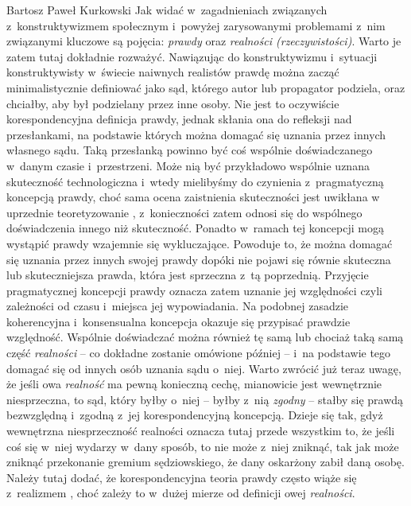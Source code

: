 \begin{artplenv}{Bartosz Paweł Kurkowski}
Jak widać w~zagadnieniach związanych z~konstruktywizmem społecznym i~powyżej zarysowanymi problemami z~nim związanymi
kluczowe są pojęcia: \textit{prawdy }oraz\textit{ realności (rzeczywistości)}. Warto je zatem tutaj dokładnie rozważyć.
Nawiązując do konstruktywizmu i~sytuacji konstruktywisty w~świecie naiwnych realistów prawdę można zacząć
minimalistycznie definiować jako sąd, którego autor lub propagator podziela, oraz chciałby, aby był podzielany przez
inne osoby. Nie jest to oczywiście korespondencyjna definicja prawdy, jednak skłania ona do refleksji nad przesłankami,
na podstawie których można domagać się uznania przez innych własnego sądu. Taką przesłanką powinno być coś wspólnie
doświadczanego w~danym czasie i~przestrzeni. Może nią być przykładowo wspólnie uznana skuteczność
technologiczna i~wtedy mielibyśmy do czynienia z~pragmatyczną koncepcją prawdy,
choć sama ocena zaistnienia skuteczności jest uwikłana w
uprzednie teoretyzowanie
\parencite[s.~264]{grobler_metodologia_2006},
z~konieczności zatem odnosi się do wspólnego
doświadczenia innego niż skuteczność. Ponadto w~ramach tej koncepcji mogą wystąpić prawdy wzajemnie się wykluczające.
Powoduje to, że można domagać się uznania przez innych swojej prawdy dopóki nie pojawi się równie skuteczna lub
skuteczniejsza prawda, która jest sprzeczna z~tą poprzednią. Przyjęcie pragmatycznej koncepcji prawdy oznacza zatem
uznanie jej względności czyli zależności od czasu i~miejsca jej wypowiadania. Na podobnej zasadzie koherencyjna
i~konsensualna koncepcja okazuje się przypisać prawdzie względność. Wspólnie doświadczać można również tę samą lub
chociaż taką samą część \textit{realności} -- co dokładne zostanie omówione później -- i~na podstawie tego domagać się od
innych osób uznania sądu o~niej. Warto zwrócić już teraz uwagę, że jeśli owa \textit{realność} ma pewną konieczną
cechę, mianowicie jest wewnętrznie niesprzeczna, to sąd, który byłby o~niej -- byłby z~nią \textit{zgodny} -- stałby się
prawdą bezwzględną i~zgodną z~jej korespondencyjną koncepcją. Dzieje się tak, gdyż wewnętrzna niesprzeczność realności
oznacza tutaj przede wszystkim to, że jeśli coś się w~niej wydarzy w~dany sposób, to nie może z~niej zniknąć, tak jak
może zniknąć przekonanie gremium sędziowskiego, że dany oskarżony zabił daną osobę. Należy tutaj dodać, że
korespondencyjna teoria prawdy często wiąże się z~realizmem
\parencite[s.~391]{gorazda_filozofia_2014},
choć
zależy to w~dużej mierze od definicji owej \textit{realności}.


\end{artplenv}
